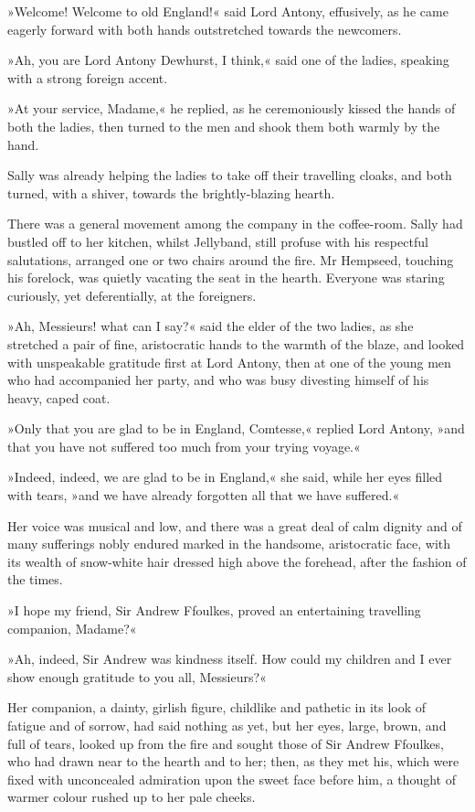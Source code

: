 »Welcome! Welcome to old England!« said Lord Antony, effusively, as he came eagerly forward with both hands outstretched towards the newcomers.

»Ah, you are Lord Antony Dewhurst, I think,« said one of the ladies, speaking with a strong foreign accent.

»At your service, Madame,« he replied, as he ceremoniously kissed the hands of both the ladies, then turned to the men and shook them both warmly by the hand.

Sally was already helping the ladies to take off their travelling cloaks, and both turned, with a shiver, towards the brightly-blazing hearth.

There was a general movement among the company in the coffee-room. Sally had bustled off to her kitchen, whilst Jellyband, still profuse with his respectful salutations, arranged one or two chairs around the fire. Mr Hempseed, touching his forelock, was quietly vacating the seat in the hearth. Everyone was staring curiously, yet deferentially, at the foreigners.

»Ah, Messieurs! what can I say?« said the elder of the two ladies, as she stretched a pair of fine, aristocratic hands to the warmth of the blaze, and looked with unspeakable gratitude first at Lord Antony, then at one of the young men who had accompanied her party, and who was busy divesting himself of his heavy, caped coat.

»Only that you are glad to be in England, Comtesse,« replied Lord Antony, »and that you have not suffered too much from your trying voyage.«

»Indeed, indeed, we are glad to be in England,« she said, while her eyes filled with tears, »and we have already forgotten all that we have suffered.«

Her voice was musical and low, and there was a great deal of calm dignity and of many sufferings nobly endured marked in the handsome, aristocratic face, with its wealth of snow-white hair dressed high above the forehead, after the fashion of the times.

»I hope my friend, Sir Andrew Ffoulkes, proved an entertaining travelling companion, Madame?«

»Ah, indeed, Sir Andrew was kindness itself. How could my children and I ever show enough gratitude to you all, Messieurs?«

Her companion, a dainty, girlish figure, childlike and pathetic in its look of fatigue and of sorrow, had said nothing as yet, but her eyes, large, brown, and full of tears, looked up from the fire and sought those of Sir Andrew Ffoulkes, who had drawn near to the hearth and to her; then, as they met his, which were fixed with unconcealed admiration upon the sweet face before him, a thought of warmer colour rushed up to her pale cheeks.

